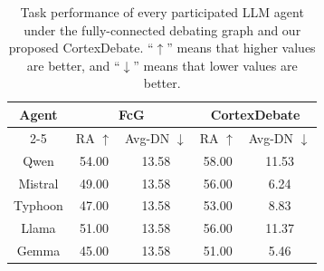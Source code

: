 \begin{table}
  \centering
  \setlength{\tabcolsep}{1.2mm}
\begin{tabular}{c|cc|cc}
\toprule
\multirow{2}{*}{Agent}               & \multicolumn{2}{c|}{FcG}   & \multicolumn{2}{c}{CortexDebate} \\ \cmidrule{2-5}
   & RA $\uparrow$  & Avg-DN $\downarrow$  & RA $\uparrow$  & Avg-DN $\downarrow$  \\   \midrule
Qwen     & 54.00   & 13.58    & 58.00  & 11.53       \\
Mistral    & 49.00  & 13.58  & 56.00   & 6.24      \\ 
Typhoon       & 47.00  & 13.58  & 53.00  & 8.83       \\
Llama & 51.00  & 13.58  & 56.00  & 11.37   \\
Gemma & 45.00  & 13.58  & 51.00  & 5.46   \\ \bottomrule
\end{tabular}
  \caption{\label{helpful}
   Task performance of every participated LLM agent under the fully-connected debating graph and our proposed CortexDebate. ``$\uparrow$'' means that higher values are better, and ``$\downarrow$'' means that lower values are better.
  }
\end{table}
